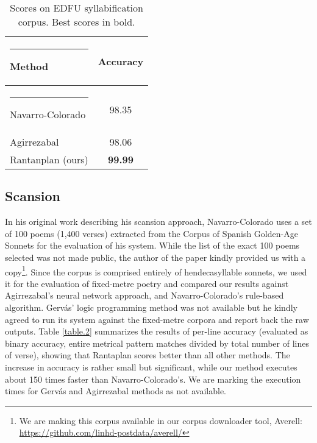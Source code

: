 \documentclass[a4paper,11pt,twocolumn,twoside]{article}
\begin{document}
\begin{table} [htbp]
\begin{center}
\begin{tabular} {lc}
  \hline\rule{-2pt}{15pt}
  {\bf Method} & {\bf Accuracy}\\
  \hline\rule{-4pt}{10pt}
  Navarro-Colorado & 98.35 \\
  Agirrezabal & 98.06 \\
  Rantanplan (ours) & \textbf{99.99} \\
\hline
\end{tabular}
\end{center}
\caption{\label{table.1}Scores on EDFU syllabification corpus. Best scores in bold.}
\end{table}

\subsection{Scansion}
In his original work describing his scansion approach, Navarro-Colorado uses a set of 100 poems (1,400 verses) extracted from the Corpus of Spanish Golden-Age Sonnets  for the evaluation of his system. While the list of the exact 100 poems selected was not made public, the author of the paper kindly provided us with a copy\footnote{We are making this corpus available in our corpus downloader tool, Averell: \url{https://github.com/linhd-postdata/averell/}}. Since the corpus is comprised entirely of hendecasyllable sonnets, we used it for the evaluation of fixed-metre poetry and compared our results against Agirrezabal's neural network approach, and Navarro-Colorado's rule-based algorithm. Gervás' logic programming method was not available but he kindly agreed to run its system against the fixed-metre corpora and report back the raw outputs. Table \ref{table.2} summarizes the results of per-line accuracy (evaluated as binary accuracy, entire metrical pattern matches divided by total number of lines of verse), showing that Rantaplan scores better than all other methods. The increase in accuracy is rather small but significant, while our method executes about 150 times faster than Navarro-Colorado's. We are marking the execution times for Gervás and Agirrezabal methods as not available.
\end{document}
